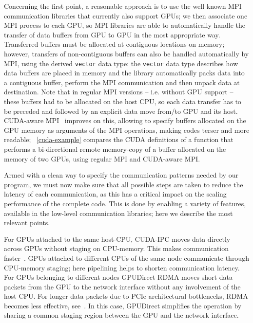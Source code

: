 \documentclass{elsarticle}
\begin{document}
Concerning the first point, a reasonable approach is to use the well known MPI
communication libraries that currently also support GPUs; 
%
we then associate one MPI process to each GPU, so MPI libraries are able to 
automatically handle the transfer of data buffers from GPU to GPU in the most 
appropriate way. 
%
Transferred buffers must be allocated at contiguous locations on memory; however, 
transfers of non-contiguous buffers can also be handled automatically by MPI, 
using the derived {\tt vector} data type: 
the {\tt vector} data type describes how data buffers are placed in memory and the 
library automatically packs data into a contiguous buffer, perform the MPI communication 
and then unpack data at destination. 
%
Note that in regular MPI versions -- i.e. without GPU support -- these buffers had 
to be allocated on the host CPU, so each data transfer has to be preceded and followed 
by an explicit data move from/to GPU and its host. 
%
CUDA-aware MPI~\cite{cuda-aware_mpi} improves on this, allowing to specify
buffers allocated on the GPU memory as arguments of the MPI operations, making 
codes terser and more readable; \figurename~\ref{cuda-example} compares the CUDA 
definitions of a function that performs a bi-directional remote memory-copy of a 
buffer allocated on the memory of two GPUs, using regular MPI and CUDA-aware MPI.

Armed with a clean way to specify the communication patterns needed by 
our program, we must now make sure that all possible steps are taken to reduce 
the latency of each communication, as this has a critical impact on 
the scaling performance of the complete code. This is done by enabling a variety 
of features, available in the low-level communication libraries; here we describe 
the most relevant points. 

For GPUs attached to the same host-CPU, CUDA-IPC moves data directly across GPUs
without staging on CPU-memory. This makes communication faster~\cite{sbac-pad13}.
%
GPUs attached to different CPUs of the same node communicate through 
CPU-memory staging; here pipelining helps to shorten communication latency.
%
For GPUs belonging to different nodes GPUDirect RDMA moves short data packets from the 
GPU to the network interface without any involvement of the host CPU. For longer  
data packets due to PCIe architectural bottlenecks, RDMA becomes 
less effective, see~\cite{rdma}. 
%
In this case, GPUDirect simplifies the operation by sharing a common staging 
region between the GPU and the network interface. 
\end{document}
